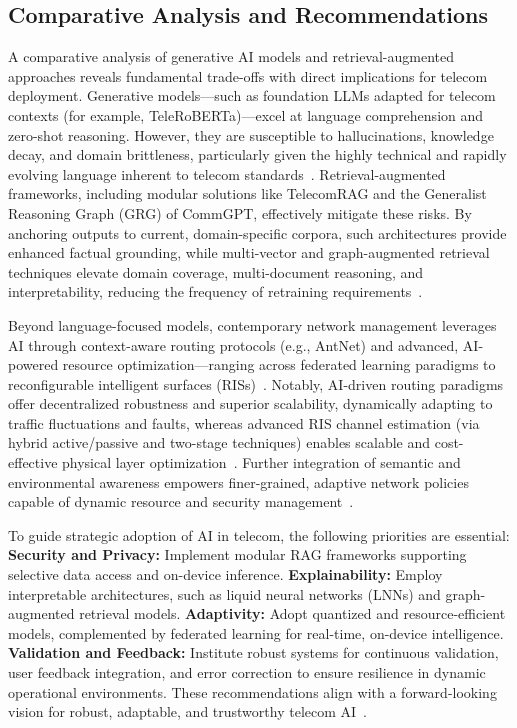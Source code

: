 \documentclass[sigconf]{acmart}
\begin{document}
\subsection{Comparative Analysis and Recommendations}

A comparative analysis of generative AI models and retrieval-augmented approaches reveals fundamental trade-offs with direct implications for telecom deployment. Generative models—such as foundation LLMs adapted for telecom contexts (for example, TeleRoBERTa)—excel at language comprehension and zero-shot reasoning. However, they are susceptible to hallucinations, knowledge decay, and domain brittleness, particularly given the highly technical and rapidly evolving language inherent to telecom standards~\cite{ref7, ref16, ref20}. Retrieval-augmented frameworks, including modular solutions like TelecomRAG and the Generalist Reasoning Graph (GRG) of CommGPT, effectively mitigate these risks. By anchoring outputs to current, domain-specific corpora, such architectures provide enhanced factual grounding, while multi-vector and graph-augmented retrieval techniques elevate domain coverage, multi-document reasoning, and interpretability, reducing the frequency of retraining requirements~\cite{ref7, ref16}.

Beyond language-focused models, contemporary network management leverages AI through context-aware routing protocols (e.g., AntNet) and advanced, AI-powered resource optimization—ranging across federated learning paradigms to reconfigurable intelligent surfaces (RISs)~\cite{ref15, ref21, ref22, ref27}. Notably, AI-driven routing paradigms offer decentralized robustness and superior scalability, dynamically adapting to traffic fluctuations and faults, whereas advanced RIS channel estimation (via hybrid active/passive and two-stage techniques) enables scalable and cost-effective physical layer optimization~\cite{ref26, ref27}. Further integration of semantic and environmental awareness empowers finer-grained, adaptive network policies capable of dynamic resource and security management~\cite{ref15, ref20, ref21, ref28}.

To guide strategic adoption of AI in telecom, the following priorities are essential:
\textbf{Security and Privacy:} Implement modular RAG frameworks supporting selective data access and on-device inference.
\textbf{Explainability:} Employ interpretable architectures, such as liquid neural networks (LNNs) and graph-augmented retrieval models.
\textbf{Adaptivity:} Adopt quantized and resource-efficient models, complemented by federated learning for real-time, on-device intelligence.
\textbf{Validation and Feedback:} Institute robust systems for continuous validation, user feedback integration, and error correction to ensure resilience in dynamic operational environments.
These recommendations align with a forward-looking vision for robust, adaptable, and trustworthy telecom AI~\cite{ref7, ref16, ref17, ref18, ref19, ref20, ref21, ref22, ref23, ref26, ref27, ref28, ref30}.
\end{document}
